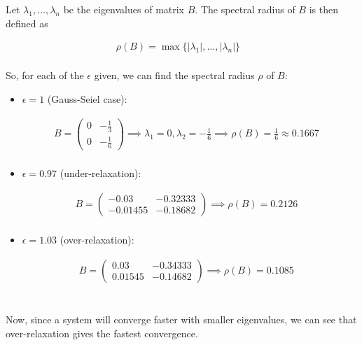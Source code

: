 \documentclass[../main.tex]{subfiles}
\begin{document}
    Let $\lambda_{1}, \dots, \lambda_{n}$ be the eigenvalues of matrix $B$.
    The spectral radius of $B$ is then defined as
    \begin{center*}
        \begin{align*}
            & \rho(B) = \max\{{|\lambda_{1}|, \dots, |\lambda_{n}|}\} && \\
        \end{align*}
    \end{center*}
    So, for each of the $\epsilon$ given, we can find the spectral radius $\rho$ of $B$:
    \begin{itemize}
        \item $\epsilon = 1$ (Gauss-Seiel case):
            \begin{center*}
                \begin{align*}
                    & B = \begin{pmatrix}
                            0 & -\frac{1}{3} \\
                            0 & -\frac{1}{6}
                        \end{pmatrix} \implies \lambda_{1} = 0, \lambda_{2} = -\frac{1}{6} \implies \rho(B) = \frac{1}{6} \approx 0.1667 && \\
                \end{align*}
            \end{center*}
        \item $\epsilon = 0.97$ (under-relaxation):
            \begin{center*}
                \begin{align*}
                    & B = \begin{pmatrix}
                            -0.03 & -0.32333 \\
                            -0.01455 & -0.18682
                        \end{pmatrix} \implies \rho(B) = 0.2126 && \\
                \end{align*}
            \end{center*}
        \item $\epsilon = 1.03$ (over-relaxation):
            \begin{center*}
                \begin{align*}
                    & B = \begin{pmatrix}
                            0.03 & -0.34333 \\
                            0.01545 & -0.14682
                        \end{pmatrix} \implies \rho(B) = 0.1085 && \\
                \end{align*}
            \end{center*}
    \end{itemize}\\
    Now, since a system will converge faster with smaller eigenvalues, we can see that
    over-relaxation gives the fastest convergence. \\
\end{document}
